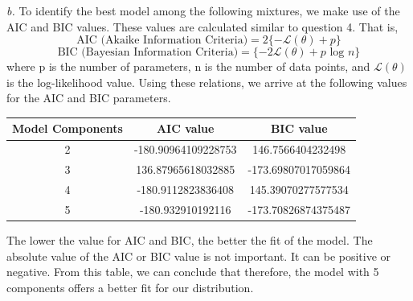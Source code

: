 \documentclass[11pt]{article}
\begin{document}
\emph{b.} To identify the best model among the following mixtures, we make use of the AIC and BIC values. These values are calculated similar to question 4. That is,
\begin{equation}
  \nonumber
  \text{AIC (Akaike Information Criteria)} = 2\{-\mathcal{L}(\theta) + p\}
\end{equation}
\begin{equation}
  \nonumber
  \text{BIC (Bayesian Information Criteria)} = \{-2\mathcal{L}(\theta) + p \text{ log }n\}
\end{equation}
where p is the number of parameters, n is the number of data points, and $\mathcal{L}(\theta)$ is the log-likelihood value. Using these relations, we arrive at the following values for the AIC and BIC parameters.
\begin{center}
\begin{tabular}{ |c|c|c| }
  \hline
 \textbf{Model Components} & \textbf{AIC value} & \textbf{BIC value}\\
 \hline
 2 & -180.90964109228753 & 146.7566404232498 \\
 \hline
 3 & 136.87965618032885 & -173.69807017059864 \\
 \hline
 4 & -180.9112823836408 & 145.39070277577534 \\
 \hline
 5 & -180.932910192116 & -173.70826874375487 \\
 \hline
\end{tabular}
\end{center}
The lower the value for AIC and BIC, the better the fit of the model. The absolute value of the AIC or BIC value is not important. It can be positive or negative. From this table, we can conclude that therefore, the model with 5 components offers a better fit for our distribution.
\end{document}
